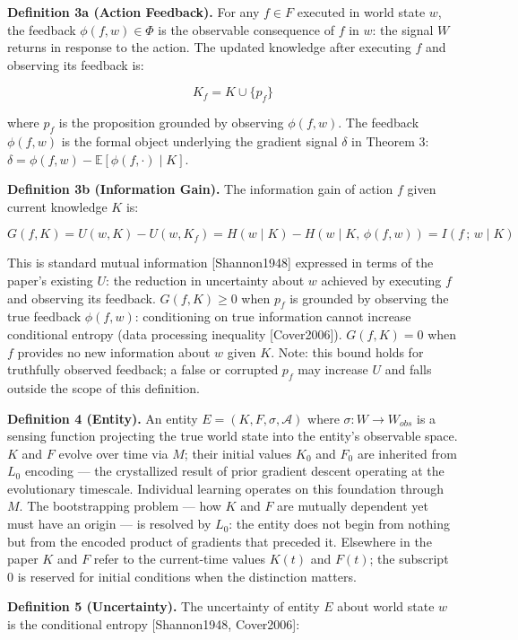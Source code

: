 \documentclass[
]{article}
\begin{document}
\textbf{Definition 3a (Action Feedback).} For any \(f \in F\) executed
in world state \(w\), the feedback \(\phi(f, w) \in \Phi\) is the
observable consequence of \(f\) in \(w\): the signal \(W\) returns in
response to the action. The updated knowledge after executing \(f\) and
observing its feedback is:

\[K_f = K \cup \{p_f\}\]

where \(p_f\) is the proposition grounded by observing \(\phi(f, w)\).
The feedback \(\phi(f,w)\) is the formal object underlying the gradient
signal \(\delta\) in Theorem 3: \(\delta =
\phi(f, w) - \mathbb{E}[\phi(f, \cdot) \mid K]\).

\textbf{Definition 3b (Information Gain).} The information gain of
action \(f\) given current knowledge \(K\) is:

\[G(f, K) = U(w, K) - U(w, K_f) = H(w \mid K) - H(w \mid K,\, \phi(f, w)) = I(f\,;\, w \mid K)\]

This is standard mutual information {[}Shannon1948{]} expressed in terms
of the paper's existing \(U\): the reduction in uncertainty about \(w\)
achieved by executing \(f\) and observing its feedback.
\(G(f, K) \geq 0\) when \(p_f\) is grounded by observing the true
feedback \(\phi(f, w)\): conditioning on true information cannot
increase conditional entropy (data processing inequality
{[}Cover2006{]}). \(G(f, K) = 0\) when \(f\) provides no new information
about \(w\) given \(K\). Note: this bound holds for truthfully observed
feedback; a false or corrupted \(p_f\) may increase \(U\) and falls
outside the scope of this definition.

\textbf{Definition 4 (Entity).} An entity
\(E = (K, F, \sigma, \mathcal{A})\) where
\(\sigma : W \rightarrow W_{obs}\) is a sensing function projecting the
true world state into the entity's observable space. \(K\) and \(F\)
evolve over time via \(M\); their initial values \(K_0\) and \(F_0\) are
inherited from \(L_0\) encoding --- the crystallized result of prior
gradient descent operating at the evolutionary timescale. Individual
learning operates on this foundation through \(M\). The bootstrapping
problem --- how \(K\) and \(F\) are mutually dependent yet must have an
origin --- is resolved by \(L_0\): the entity does not begin from
nothing but from the encoded product of gradients that preceded it.
Elsewhere in the paper \(K\) and \(F\) refer to the current-time values
\(K(t)\) and \(F(t)\); the subscript \(0\) is reserved for initial
conditions when the distinction matters.

\textbf{Definition 5 (Uncertainty).} The uncertainty of entity \(E\)
about world state \(w\) is the conditional entropy {[}Shannon1948,
Cover2006{]}:
\end{document}
